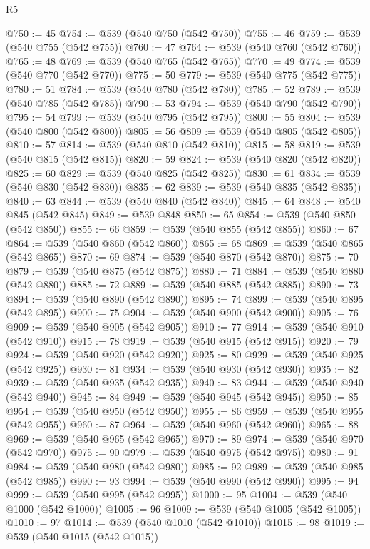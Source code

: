 \begin{lexlean}{R5}
\begin{coremodule}
@750 := 45
@754 := @539 (@540 @750 (@542 @750))
@755 := 46
@759 := @539 (@540 @755 (@542 @755))
@760 := 47
@764 := @539 (@540 @760 (@542 @760))
@765 := 48
@769 := @539 (@540 @765 (@542 @765))
@770 := 49
@774 := @539 (@540 @770 (@542 @770))
@775 := 50
@779 := @539 (@540 @775 (@542 @775))
@780 := 51
@784 := @539 (@540 @780 (@542 @780))
@785 := 52
@789 := @539 (@540 @785 (@542 @785))
@790 := 53
@794 := @539 (@540 @790 (@542 @790))
@795 := 54
@799 := @539 (@540 @795 (@542 @795))
@800 := 55
@804 := @539 (@540 @800 (@542 @800))
@805 := 56
@809 := @539 (@540 @805 (@542 @805))
@810 := 57
@814 := @539 (@540 @810 (@542 @810))
@815 := 58
@819 := @539 (@540 @815 (@542 @815))
@820 := 59
@824 := @539 (@540 @820 (@542 @820))
@825 := 60
@829 := @539 (@540 @825 (@542 @825))
@830 := 61
@834 := @539 (@540 @830 (@542 @830))
@835 := 62
@839 := @539 (@540 @835 (@542 @835))
@840 := 63
@844 := @539 (@540 @840 (@542 @840))
@845 := 64
@848 := @540 @845 (@542 @845)
@849 := @539 @848
@850 := 65
@854 := @539 (@540 @850 (@542 @850))
@855 := 66
@859 := @539 (@540 @855 (@542 @855))
@860 := 67
@864 := @539 (@540 @860 (@542 @860))
@865 := 68
@869 := @539 (@540 @865 (@542 @865))
@870 := 69
@874 := @539 (@540 @870 (@542 @870))
@875 := 70
@879 := @539 (@540 @875 (@542 @875))
@880 := 71
@884 := @539 (@540 @880 (@542 @880))
@885 := 72
@889 := @539 (@540 @885 (@542 @885))
@890 := 73
@894 := @539 (@540 @890 (@542 @890))
@895 := 74
@899 := @539 (@540 @895 (@542 @895))
@900 := 75
@904 := @539 (@540 @900 (@542 @900))
@905 := 76
@909 := @539 (@540 @905 (@542 @905))
@910 := 77
@914 := @539 (@540 @910 (@542 @910))
@915 := 78
@919 := @539 (@540 @915 (@542 @915))
@920 := 79
@924 := @539 (@540 @920 (@542 @920))
@925 := 80
@929 := @539 (@540 @925 (@542 @925))
@930 := 81
@934 := @539 (@540 @930 (@542 @930))
@935 := 82
@939 := @539 (@540 @935 (@542 @935))
@940 := 83
@944 := @539 (@540 @940 (@542 @940))
@945 := 84
@949 := @539 (@540 @945 (@542 @945))
@950 := 85
@954 := @539 (@540 @950 (@542 @950))
@955 := 86
@959 := @539 (@540 @955 (@542 @955))
@960 := 87
@964 := @539 (@540 @960 (@542 @960))
@965 := 88
@969 := @539 (@540 @965 (@542 @965))
@970 := 89
@974 := @539 (@540 @970 (@542 @970))
@975 := 90
@979 := @539 (@540 @975 (@542 @975))
@980 := 91
@984 := @539 (@540 @980 (@542 @980))
@985 := 92
@989 := @539 (@540 @985 (@542 @985))
@990 := 93
@994 := @539 (@540 @990 (@542 @990))
@995 := 94
@999 := @539 (@540 @995 (@542 @995))
@1000 := 95
@1004 := @539 (@540 @1000 (@542 @1000))
@1005 := 96
@1009 := @539 (@540 @1005 (@542 @1005))
@1010 := 97
@1014 := @539 (@540 @1010 (@542 @1010))
@1015 := 98
@1019 := @539 (@540 @1015 (@542 @1015))

\end{coremodule}
\end{lexlean}
